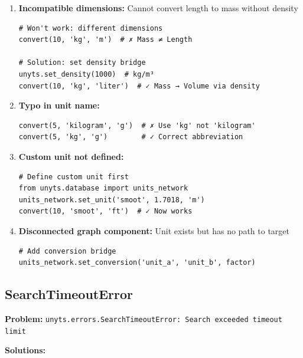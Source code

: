 \documentclass[11pt,a4paper]{report}
\begin{document}
\begin{enumerate}
\item \textbf{Incompatible dimensions:} Cannot convert length to mass without density
\begin{lstlisting}[style=pythonstyle]
# Won't work: different dimensions
convert(10, 'kg', 'm')  # ✗ Mass ≠ Length

# Solution: set density bridge
unyts.set_density(1000)  # kg/m³
convert(10, 'kg', 'liter')  # ✓ Mass → Volume via density
\end{lstlisting}

\item \textbf{Typo in unit name:}
\begin{lstlisting}[style=pythonstyle]
convert(5, 'kilogram', 'g')  # ✗ Use 'kg' not 'kilogram'
convert(5, 'kg', 'g')        # ✓ Correct abbreviation
\end{lstlisting}

\item \textbf{Custom unit not defined:}
\begin{lstlisting}[style=pythonstyle]
# Define custom unit first
from unyts.database import units_network
units_network.set_unit('smoot', 1.7018, 'm')
convert(10, 'smoot', 'ft')  # ✓ Now works
\end{lstlisting}

\item \textbf{Disconnected graph component:} Unit exists but has no path to target
\begin{lstlisting}[style=pythonstyle]
# Add conversion bridge
units_network.set_conversion('unit_a', 'unit_b', factor)
\end{lstlisting}
\end{enumerate}

\subsection{SearchTimeoutError}

\textbf{Problem:} \texttt{unyts.errors.SearchTimeoutError: Search exceeded timeout limit}

\textbf{Solutions:}
\end{document}
